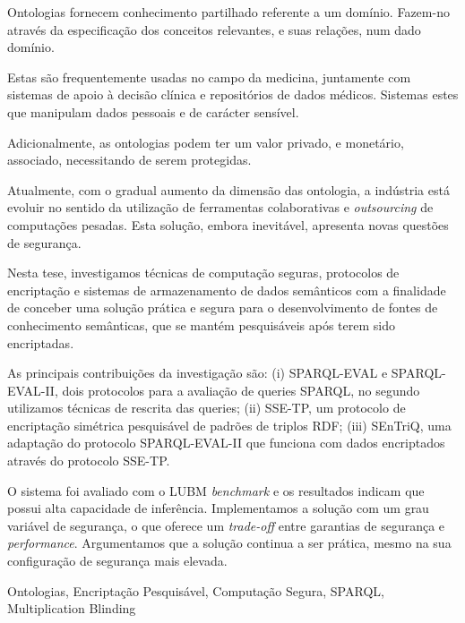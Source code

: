 %

Ontologias fornecem conhecimento partilhado referente a um domínio. Fazem-no através da especificação dos conceitos relevantes, e suas relações, num dado domínio.

Estas são frequentemente usadas no campo da medicina, juntamente com sistemas de apoio à decisão clínica e repositórios de dados médicos. Sistemas estes que manipulam dados pessoais e de carácter sensível. 

Adicionalmente, as ontologias podem ter um valor privado, e monetário, associado, necessitando de serem protegidas.

Atualmente, com o gradual aumento da dimensão das ontologia, a indústria está evoluir no sentido da utilização de ferramentas colaborativas e \emph{outsourcing} de computações pesadas. Esta solução, embora inevitável, apresenta novas questões de segurança.

Nesta tese, investigamos técnicas de computação seguras, protocolos de encriptação e sistemas de armazenamento de dados semânticos com a finalidade de conceber uma solução prática e segura para o desenvolvimento de fontes de conhecimento semânticas, que se mantém pesquisáveis após terem sido encriptadas.

As principais contribuições da investigação são: (i) SPARQL-EVAL e SPARQL-EVAL-II, dois protocolos para a avaliação de queries \gls{SPARQL}, no segundo utilizamos técnicas de rescrita das queries; (ii) SSE-TP, um protocolo de encriptação simétrica pesquisável de padrões de triplos \gls{RDF}; (iii) \gls{SEnTriQ}, uma adaptação do protocolo SPARQL-EVAL-II que funciona com dados encriptados através do protocolo SSE-TP.

O sistema foi avaliado com o \gls{LUBM} \emph{benchmark} e os resultados indicam que possui alta capacidade de inferência. Implementamos a solução com um grau variável de segurança, o que oferece um \emph{trade-off} entre garantias de segurança e \emph{performance}. Argumentamos que a solução continua a ser prática, mesmo na sua configuração de segurança mais elevada.

\begin{keywords}
Ontologias, Encriptação Pesquisável, Computação Segura, SPARQL, Multiplication Blinding
\end{keywords} 



